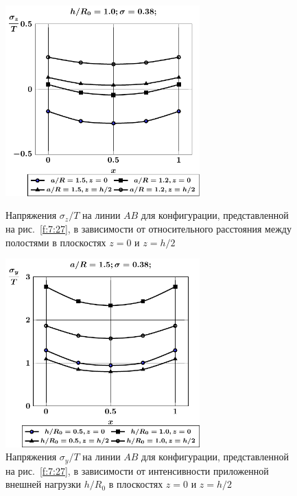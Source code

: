 \begin{russian}
\begin{figure}[h!]
\centering\footnotesize
\parbox[b]{7.5cm}{\centering\includegraphics[width=7.5cm]{cav16-sig_z.pdf}
\caption{Напряжения $\sigma_z/T$ на линии $AB$ для конфигурации, представленной на рис.~\ref{f:7:27}, в зависимости от относительного расстояния между полостями в плоскостях $z=0$ и $z=h/2$
\label{f:7:30}}}\hfil\hfil
\parbox[b]{7.5cm}{\centering\includegraphics[width=7.5cm]{cav16-h-sig_y.pdf}
\caption{Напряжения $\sigma_y/T$ на линии $AB$ для конфигурации, представленной на рис.~\ref{f:7:27}, в зависимости от интенсивности приложенной внешней нагрузки $h/R_0$ в плоскостях $z=0$ и $z=h/2$
\label{f:7:31}}}
\end{figure}


\end{russian}
